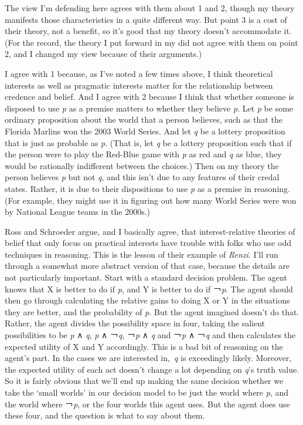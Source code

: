 \documentclass[
  11pt,
]{book}
\begin{document}
The view I'm defending here agrees with them about 1 and 2, though my theory manifests those characteristics in a quite different way. But point 3 is a cost of their theory, not a benefit, so it's good that my theory doesn't accommodate it. (For the record, the theory I put forward in my \citeyearpar{Weatherson2005-WEACWD} did not agree with them on point 2, and I changed my view because of their arguments.)

I agree with 1 because, as I've noted a few times above, I think theoretical interests as well as pragmatic interests matter for the relationship between credence and belief. And I agree with 2 because I think that whether someone is disposed to use \emph{p} as a premise matters to whether they believe \emph{p}. Let \emph{p} be some ordinary proposition about the world that a person believes, such as that the Florida Marlins won the 2003 World Series. And let \emph{q} be a lottery proposition that is just as probable as \emph{p}. (That is, let \emph{q} be a lottery proposition such that if the person were to play the Red-Blue game with \emph{p} as red and \emph{q} as blue, they would be rationally indifferent between the choices.) Then on my theory the person believes \emph{p} but not \emph{q}, and this isn't due to any features of their credal states. Rather, it is due to their dispositions to use \emph{p} as a premise in reasoning. (For example, they might use it in figuring out how many World Series were won by National League teams in the 2000s.)

Ross and Schroeder argue, and I basically agree, that interest-relative theories of belief that only focus on practical interests have trouble with folks who use odd techniques in reasoning. This is the lesson of their example of \emph{Renzi}. I'll run through a somewhat more abstract version of that case, because the details are not particularly important. Start with a standard decision problem. The agent knows that X is better to do if \emph{p}, and Y is better to do if ￢\emph{p}. The agent should then go through calculating the relative gains to doing X or Y in the situations they are better, and the probability of \emph{p}. But the agent imagined doesn't do that. Rather, the agent divides the possibility space in four, taking the salient possibilities to be \emph{p} ∧ \emph{q}, \emph{p} ∧ ￢\emph{q}, ￢\emph{p} ∧ \emph{q} and ￢\emph{p} ∧ ￢\emph{q} and then calculates the expected utility of X and Y accordingly. This is a bad bit of reasoning on the agent's part. In the cases we are interested in,~\emph{q} is exceedingly likely. Moreover, the expected utility of each act doesn't change a lot depending on \emph{q}'s truth value. So it is fairly obvious that we'll end up making the same decision whether we take the `small worlds' in our decision model to be just the world where \emph{p}, and the world where ￢\emph{p}, or the four worlds this agent uses. But the agent does use these four, and the question is what to say about them.
\end{document}
